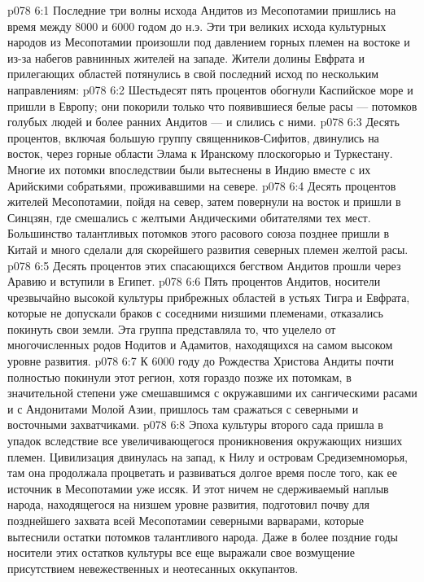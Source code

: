 \vs p078 6:1 Последние три волны исхода Андитов из Месопотамии пришлись на время между 8000 и 6000 годом до н.э. Эти три великих исхода культурных народов из Месопотамии произошли под давлением горных племен на востоке и из\hyp{}за набегов равнинных жителей на западе. Жители долины Евфрата и прилегающих областей потянулись в свой последний исход по нескольким направлениям:
\vs p078 6:2 Шестьдесят пять процентов обогнули Каспийское море и пришли в Европу; они покорили только что появившиеся белые расы --- потомков голубых людей и более ранних Андитов --- и слились с ними.
\vs p078 6:3 Десять процентов, включая большую группу священников\hyp{}Сифитов, двинулись на восток, через горные области Элама к Иранскому плоскогорью и Туркестану. Многие их потомки впоследствии были вытеснены в Индию вместе с их Арийскими собратьями, проживавшими на севере.
\vs p078 6:4 Десять процентов жителей Месопотамии, пойдя на север, затем повернули на восток и пришли в Синцзян, где смешались с желтыми Андическими обитателями тех мест. Большинство талантливых потомков этого расового союза позднее пришли в Китай и много сделали для скорейшего развития северных племен желтой расы.
\vs p078 6:5 Десять процентов этих спасающихся бегством Андитов прошли через Аравию и вступили в Египет.
\vs p078 6:6 \pc Пять процентов Андитов, носители чрезвычайно высокой культуры прибрежных областей в устьях Тигра и Евфрата, которые не допускали браков с соседними низшими племенами, отказались покинуть свои земли. Эта группа представляла то, что уцелело от многочисленных родов Нодитов и Адамитов, находящихся на самом высоком уровне развития.
\vs p078 6:7 \pc К 6000 году до Рождества Христова Андиты почти полностью покинули этот регион, хотя гораздо позже их потомкам, в значительной степени уже смешавшимся с окружавшими их сангическими расами и с Андонитами Молой Азии, пришлось там сражаться с северными и восточными захватчиками.
\vs p078 6:8 Эпоха культуры второго сада пришла в упадок вследствие все увеличивающегося проникновения окружающих низших племен. Цивилизация двинулась на запад, к Нилу и островам Средиземноморья, там она продолжала процветать и развиваться долгое время после того, как ее источник в Месопотамии уже иссяк. И этот ничем не сдерживаемый наплыв народа, находящегося на низшем уровне развития, подготовил почву для позднейшего захвата всей Месопотамии северными варварами, которые вытеснили остатки потомков талантливого народа. Даже в более поздние годы носители этих остатков культуры все еще выражали свое возмущение присутствием невежественных и неотесанных оккупантов.
